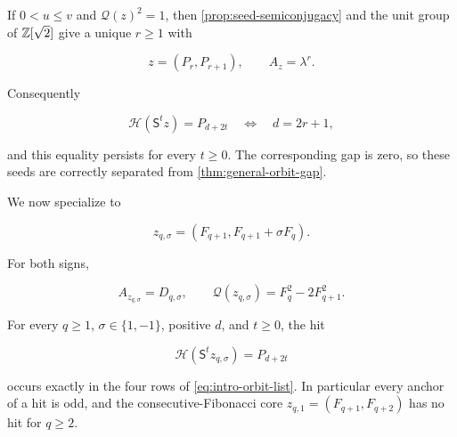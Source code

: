 \begin{remark}
\label{rem:canonical-seeds}
If $0<u\leqslant v$ and $\mathcal Q(z)^2=1$, then
\cref{prop:seed-semiconjugacy} and the unit group of $\mathbb{Z}[\sqrt2]$ give a
unique $r\geqslant1$ with

\begin{equation}
 z=(P_r,P_{r+1}),
 \qquad
 A_z=\lambda^r.
\end{equation}

Consequently

\begin{equation}
 \mathcal H(\mathsf S^tz)=P_{d+2t}
 \quad\Longleftrightarrow\quad
 d=2r+1,
\end{equation}

and this equality persists for every $t\geqslant0$. The corresponding gap
is zero, so these seeds are correctly separated from
\cref{thm:general-orbit-gap}.
\end{remark}

We now specialize to

\begin{equation}
 z_{q,\sigma}=(F_{q+1},F_{q+1}+\sigma F_q).
 \label{eq:fibonacci-cores}
\end{equation}

For both signs,

\begin{equation}
 A_{z_{q,\sigma}}=D_{q,\sigma},
 \qquad
 \mathcal Q(z_{q,\sigma})=F_q^2-2F_{q+1}^2.
 \label{eq:fibonacci-core-map}
\end{equation}

\begin{theorem}
\label{thm:complete-fibonacci-orbits}
For every $q\geqslant1$, $\sigma\in\{1,-1\}$, positive $d$, and
$t\geqslant0$, the hit

\begin{equation}
 \mathcal H(\mathsf S^tz_{q,\sigma})=P_{d+2t}
 \label{eq:fibonacci-orbit-hit}
\end{equation}

occurs exactly in the four rows of \cref{eq:intro-orbit-list}. In
particular every anchor of a hit is odd, and the consecutive-Fibonacci core
$z_{q,1}=(F_{q+1},F_{q+2})$ has no hit for $q\geqslant2$.
\end{theorem}

